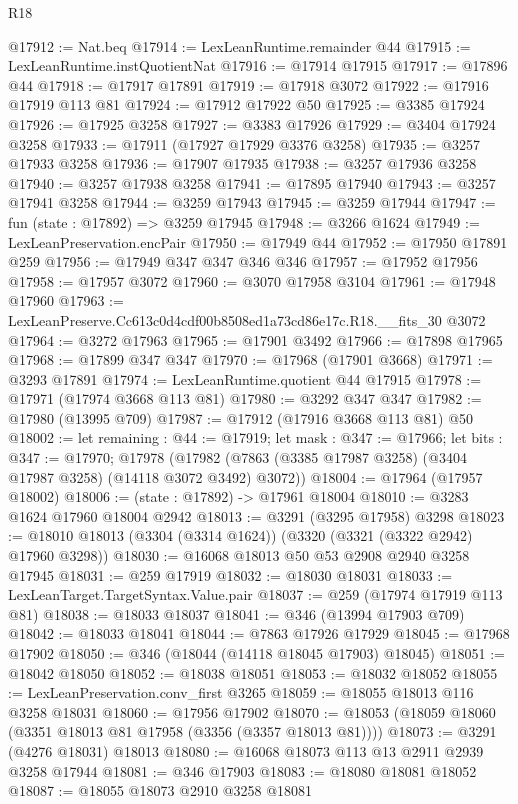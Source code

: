 \begin{lexlean}{R18}
\begin{coremodule}
@17912 := Nat.beq
@17914 := LexLeanRuntime.remainder @44
@17915 := LexLeanRuntime.instQuotientNat
@17916 := @17914 @17915
@17917 := @17896 @44
@17918 := @17917 @17891
@17919 := @17918 @3072
@17922 := @17916 @17919 @113 @81
@17924 := @17912 @17922 @50
@17925 := @3385 @17924
@17926 := @17925 @3258
@17927 := @3383 @17926
@17929 := @3404 @17924 @3258
@17933 := @17911 (@17927 @17929 @3376 @3258)
@17935 := @3257 @17933 @3258
@17936 := @17907 @17935
@17938 := @3257 @17936 @3258
@17940 := @3257 @17938 @3258
@17941 := @17895 @17940
@17943 := @3257 @17941 @3258
@17944 := @3259 @17943
@17945 := @3259 @17944
@17947 := fun (state : @17892) => @3259 @17945
@17948 := @3266 @1624
@17949 := LexLeanPreservation.encPair
@17950 := @17949 @44
@17952 := @17950 @17891 @259
@17956 := @17949 @347 @347 @346 @346
@17957 := @17952 @17956
@17958 := @17957 @3072
@17960 := @3070 @17958 @3104
@17961 := @17948 @17960
@17963 := LexLeanPreserve.Cc613c0d4cdf00b8508ed1a73cd86e17c.R18.__fits_30 @3072
@17964 := @3272 @17963
@17965 := @17901 @3492
@17966 := @17898 @17965
@17968 := @17899 @347 @347
@17970 := @17968 (@17901 @3668)
@17971 := @3293 @17891
@17974 := LexLeanRuntime.quotient @44 @17915
@17978 := @17971 (@17974 @3668 @113 @81)
@17980 := @3292 @347 @347
@17982 := @17980 (@13995 @709)
@17987 := @17912 (@17916 @3668 @113 @81) @50
@18002 := let remaining : @44 := @17919;
  let mask : @347 := @17966;
  let bits : @347 := @17970;
  @17978 (@17982 (@7863 (@3385 @17987 @3258) (@3404 @17987 @3258) (@14118 @3072 @3492) @3072))
@18004 := @17964 (@17957 @18002)
@18006 := (state : @17892) -> @17961 @18004
@18010 := @3283 @1624 @17960 @18004 @2942
@18013 := @3291 (@3295 @17958) @3298
@18023 := @18010 @18013 (@3304 (@3314 @1624)) (@3320 (@3321 (@3322 @2942) @17960 @3298))
@18030 := @16068 @18013 @50 @53 @2908 @2940 @3258 @17945
@18031 := @259 @17919
@18032 := @18030 @18031
@18033 := LexLeanTarget.TargetSyntax.Value.pair
@18037 := @259 (@17974 @17919 @113 @81)
@18038 := @18033 @18037
@18041 := @346 (@13994 @17903 @709)
@18042 := @18033 @18041
@18044 := @7863 @17926 @17929
@18045 := @17968 @17902
@18050 := @346 (@18044 (@14118 @18045 @17903) @18045)
@18051 := @18042 @18050
@18052 := @18038 @18051
@18053 := @18032 @18052
@18055 := LexLeanPreservation.conv_first @3265
@18059 := @18055 @18013 @116 @3258 @18031
@18060 := @17956 @17902
@18070 := @18053 (@18059 @18060 (@3351 @18013 @81 @17958 (@3356 (@3357 @18013 @81))))
@18073 := @3291 (@4276 @18031) @18013
@18080 := @16068 @18073 @113 @13 @2911 @2939 @3258 @17944
@18081 := @346 @17903
@18083 := @18080 @18081 @18052
@18087 := @18055 @18073 @2910 @3258 @18081

\end{coremodule}
\end{lexlean}
